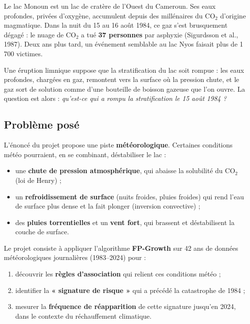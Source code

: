 \documentclass[12pt, a4paper]{article}
\begin{document}
Le lac Monoun est un lac de cratère de l'Ouest du Cameroun. Ses eaux profondes, privées
d'oxygène, accumulent depuis des millénaires du CO$_2$ d'origine magmatique. Dans la nuit du
15 au 16 août 1984, ce gaz s'est brusquement dégagé : le nuage de CO$_2$ a tué
\textbf{37 personnes} par asphyxie (Sigurdsson et al., 1987). Deux ans plus tard, un
événement semblable au lac Nyos faisait plus de 1\,700 victimes.

Une éruption limnique suppose que la stratification du lac soit rompue : les eaux profondes,
chargées en gaz, remontent vers la surface où la pression chute, et le gaz sort de solution
comme d'une bouteille de boisson gazeuse que l'on ouvre. La question est alors : \emph{qu'est-ce
qui a rompu la stratification le 15 août 1984 ?}

\subsection{Problème posé}

L'énoncé du projet propose une piste \textbf{météorologique}. Certaines conditions météo
pourraient, en se combinant, déstabiliser le lac :
\begin{itemize}
  \item une \textbf{chute de pression atmosphérique}, qui abaisse la solubilité du CO$_2$
        (loi de Henry) ;
  \item un \textbf{refroidissement de surface} (nuits froides, pluies froides) qui rend l'eau
        de surface plus dense et la fait plonger (inversion convective) ;
  \item des \textbf{pluies torrentielles} et un \textbf{vent fort}, qui brassent et
        déstabilisent la couche de surface.
\end{itemize}

Le projet consiste à appliquer l'algorithme \textbf{FP-Growth} sur 42 ans de données
météorologiques journalières (1983--2024) pour :
\begin{enumerate}
  \item découvrir les \textbf{règles d'association} qui relient ces conditions météo ;
  \item identifier la \textbf{« signature de risque »} qui a précédé la catastrophe de 1984 ;
  \item mesurer la \textbf{fréquence de réapparition} de cette signature jusqu'en 2024, dans le
        contexte du réchauffement climatique.
\end{enumerate}
\end{document}
